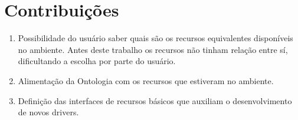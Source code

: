 \section{Contribuições}

\begin{enumerate}
	\item Possibilidade do usuário saber quais são os recursos equivalentes disponíveis no ambiente. Antes deste trabalho os recursos não tinham relação entre sí, dificultando a escolha por parte do usuário.
	\item Alimentação da Ontologia com os recursos que estiveram no ambiente.
	\item Definição das interfaces de recursos básicos que auxiliam o desenvolvimento de novos drivers.
\end{enumerate}